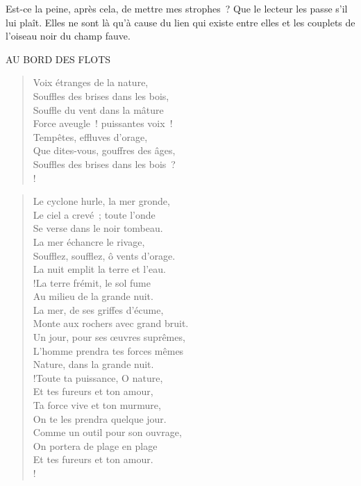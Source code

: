 \documentclass[french,twoside]{book} %
\newenvironment{quoteblock}%
  {\begin{quoting}}
  {\end{quoting}}
\newenvironment{quotebar}{%
    \def\FrameCommand{{\color{rubric!10!}\vrule width 0.5em} \hspace{0.9em}}%
    \def\OuterFrameSep{\itemsep} %
    \MakeFramed {\advance\hsize-\width \FrameRestore}
  }%
  {%
    \endMakeFramed
  }
\renewenvironment{quoteblock}%
  {%
    \savenotes
    \setstretch{0.9}
    \normalfont
    \begin{quotebar}
  }
  {%
    \end{quotebar}
    \spewnotes
  }
\begin{document}
\noindent Est-ce la peine, après cela, de mettre mes strophes ? Que le lecteur les passe s’il lui plaît. Elles ne sont là qu’à cause du lien qui existe entre elles et les couplets de l’oiseau noir du champ fauve.\par

\begin{quoteblock}
AU BORD DES FLOTS\end{quoteblock}

\begin{verse}
Voix étranges de la nature,\\
Souffles des brises dans les bois,\\
Souffle du vent dans la mâture\\
Force aveugle ! puissantes voix !\\
Tempêtes, effluves d’orage,\\
Que dites-vous, gouffres des âges,\\
Souffles des brises dans les bois ?\\!
\end{verse}
\begin{quoteblock}
 \end{quoteblock}

\begin{verse}
Le cyclone hurle, la mer gronde,\\
Le ciel a crevé ; toute l’onde\\
Se verse dans le noir tombeau.\\
La mer échancre le rivage,\\
Soufflez, soufflez, ô vents d’orage.\\
La nuit emplit la terre et l’eau.\\!La terre frémit, le sol fume\\
Au milieu de la grande nuit.\\
La mer, de ses griffes d’écume,\\
Monte aux rochers avec grand bruit.\\
Un jour, pour ses œuvres suprêmes,\\
L’homme prendra tes forces mêmes\\
Nature, dans la grande nuit.\\!Toute ta puissance, O nature,\\
Et tes fureurs et ton amour,\\
Ta force vive et ton murmure,\\
On te les prendra quelque jour.\\
Comme un outil pour son ouvrage,\\
On portera de plage en plage\\
Et tes fureurs et ton amour.\\!
\end{verse}
\end{document}
